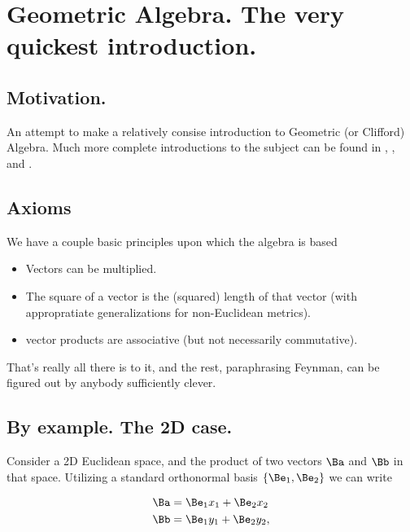
%

\chapter{Geometric Algebra.  The very quickest introduction.}
\label{chap:gaQuickIntro}
{}
\date{Mar 16, 2012}

\beginArtWithToc

\section{Motivation.}

An attempt to make a relatively consise introduction to Geometric (or Clifford) Algebra.  Much more complete introductions to the subject can be found in \cite{dorst2007gac}, \cite{doran2003gap}, and \cite{hestenes1999nfc}.

\section{Axioms}

We have a couple basic principles upon which the algebra is based

\begin{itemize}
\item Vectors can be multiplied.
\item The square of a vector is the (squared) length of that vector (with appropratiate generalizations for non-Euclidean metrics).
\item vector products are associative (but not necessarily commutative).
\end{itemize}

That's really all there is to it, and the rest, paraphrasing Feynman, can be figured out by anybody sufficiently clever.

\section{By example.  The 2D case.}

Consider a 2D Euclidean space, and the product of two vectors $\Ba$ and $\Bb$ in that space.  Utilizing a standard orthonormal basis $\{\Be_1, \Be_2\}$ we can write

\begin{align}\label{eqn:gaQuickIntro:10}
\Ba &= \Be_1 x_1 + \Be_2 x_2 \\
\Bb &= \Be_1 y_1 + \Be_2 y_2,
\end{align}

